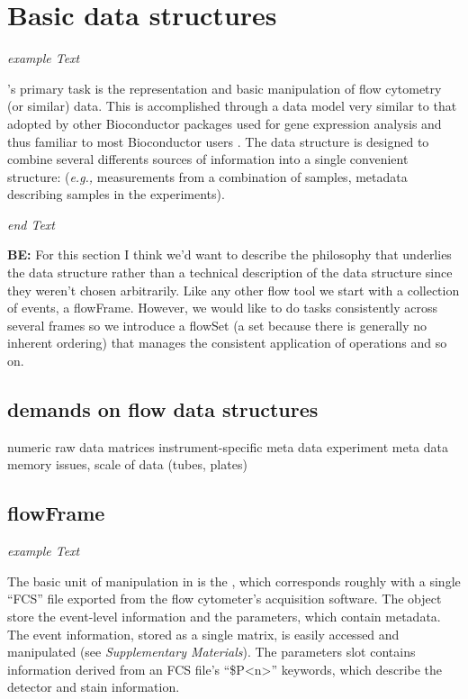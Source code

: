 \documentclass[12pt]{article}
\begin{document}
\section{Basic data structures}

\textit{example Text}

's primary task is the representation and basic
manipulation of flow cytometry (or similar) data. This is accomplished
through a data model very similar to that adopted by other
Bioconductor packages used for gene expression analysis and thus
familiar to most Bioconductor users \cite{}.  The data structure is
designed to combine several differents sources of information into a
single convenient structure: (\textit{e.g.,} measurements from a
combination of samples, metadata describing samples in the
experiments).

\textit{end Text}


{\bf BE:} For this section I think we'd want to describe the philosophy that
underlies the data structure rather than a technical description of
the data structure since they weren't chosen arbitrarily. Like any
other flow tool we start with a collection of events, a flowFrame.
However, we would like to do tasks consistently across several frames
so we introduce a flowSet (a set because there is generally no
inherent ordering) that manages the consistent application of
operations and so on.

\subsection{demands on flow data structures}


numeric raw data matrices
instrument-specific meta data
experiment meta data
memory issues, scale of data (tubes, plates)

\subsection{flowFrame}

\textit{example Text} 

The basic unit of manipulation in  is the
, which corresponds roughly with a single ``FCS''
file exported from the flow cytometer's acquisition software. The
 object store the event-level information and the
parameters, which contain metadata. The event information, stored as a
single matrix, is easily accessed and manipulated (see
\textit{Supplementary Materials}). The parameters slot contains
information derived from an FCS file's ``\$P<n>'' keywords, which
describe the detector and stain information.
\end{document}
